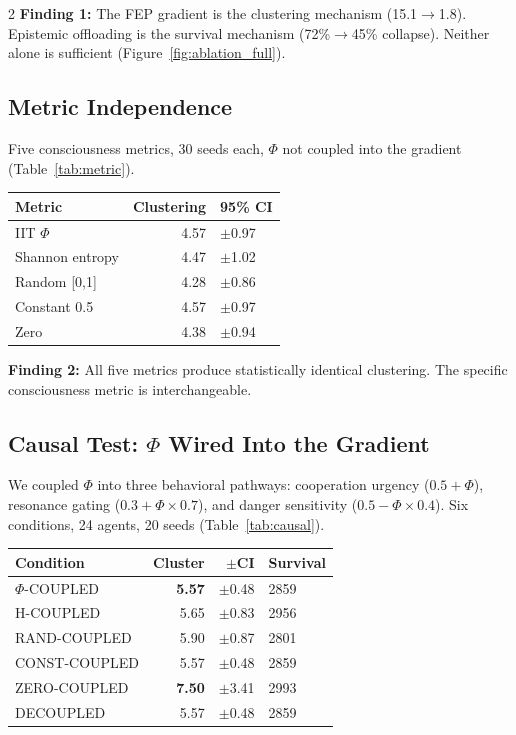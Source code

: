 \documentclass[letterpaper]{article}
\begin{document}
\begin{multicols}{2}
\textbf{Finding 1:} The FEP gradient is the clustering mechanism (15.1$\to$1.8). Epistemic offloading is the survival mechanism (72\%$\to$45\% collapse). Neither alone is sufficient (Figure~\ref{fig:ablation_full}).

\subsection{Metric Independence}

Five consciousness metrics, 30 seeds each, $\Phi$ not coupled into the gradient (Table~\ref{tab:metric}).

\begingroup
\centering
\small
{}
\label{tab:metric}
\begin{tabular}{lrl}
\toprule
Metric & Clustering & 95\% CI \\
\midrule
IIT $\Phi$ & 4.57 & $\pm$0.97 \\
Shannon entropy & 4.47 & $\pm$1.02 \\
Random [0,1] & 4.28 & $\pm$0.86 \\
Constant 0.5 & 4.57 & $\pm$0.97 \\
Zero & 4.38 & $\pm$0.94 \\
\bottomrule
\end{tabular}
\endgroup

\textbf{Finding 2:} All five metrics produce statistically identical clustering. The specific consciousness metric is interchangeable.

\subsection{Causal Test: $\Phi$ Wired Into the Gradient}

We coupled $\Phi$ into three behavioral pathways: cooperation urgency ($0.5+\Phi$), resonance gating ($0.3+\Phi \times 0.7$), and danger sensitivity ($0.5-\Phi \times 0.4$). Six conditions, 24 agents, 20 seeds (Table~\ref{tab:causal}).

\begingroup
\centering
\small
{}
\label{tab:causal}
\begin{tabular}{lrrl}
\toprule
Condition & Cluster & $\pm$CI & Survival \\
\midrule
$\Phi$-COUPLED & \textbf{5.57} & $\pm$0.48 & 2859 \\
H-COUPLED & 5.65 & $\pm$0.83 & 2956 \\
RAND-COUPLED & 5.90 & $\pm$0.87 & 2801 \\
CONST-COUPLED & 5.57 & $\pm$0.48 & 2859 \\
ZERO-COUPLED & \textbf{7.50} & $\pm$3.41 & 2993 \\
DECOUPLED & 5.57 & $\pm$0.48 & 2859 \\
\bottomrule
\end{tabular}
\endgroup


\end{multicols}
\end{document}

